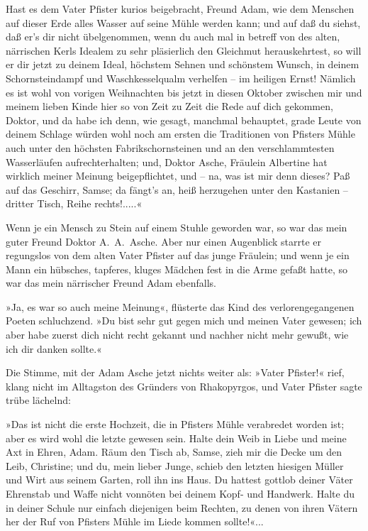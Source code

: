 Hast es dem Vater Pfister kurios beigebracht, Freund Adam, wie dem
Menschen auf dieser Erde alles Wasser auf seine Mühle werden kann;
und auf daß du siehst, daß er's dir nicht übelgenommen, wenn du
auch mal in betreff von des alten, närrischen Kerls Idealem zu sehr
pläsierlich den Gleichmut herauskehrtest, so will er dir jetzt zu
deinem Ideal, höchstem Sehnen und schönstem Wunsch, in deinem
Schornsteindampf und Waschkesselqualm verhelfen – im heiligen
Ernst! Nämlich es ist wohl von vorigen Weihnachten bis jetzt in
diesen Oktober zwischen mir und meinem lieben Kinde hier so von
Zeit zu Zeit die Rede auf dich gekommen, Doktor, und da habe ich
denn, wie gesagt, manchmal behauptet, grade Leute von deinem
Schlage würden wohl noch am ersten die Traditionen von Pfisters
Mühle auch unter den höchsten Fabrikschornsteinen und an den
verschlammtesten Wasserläufen aufrechterhalten; und, Doktor Asche,
Fräulein Albertine hat wirklich meiner Meinung beigepflichtet, und
– na, was ist mir denn dieses? Paß auf das Geschirr, Samse; da
fängt's an, heiß herzugehen unter den Kastanien – dritter Tisch,
Reihe rechts!.....«

Wenn je ein Mensch zu Stein auf einem Stuhle geworden war, so war
das mein guter Freund Doktor A.~A.~Asche. Aber nur einen Augenblick
starrte er regungslos von dem alten Vater Pfister auf das junge
Fräulein; und wenn je ein Mann ein hübsches, tapferes, kluges
Mädchen fest in die Arme gefaßt hatte, so war das mein närrischer
Freund Adam ebenfalls.

»Ja, es war so auch meine Meinung«, flüsterte das Kind des
verlorengegangenen Poeten schluchzend. »Du bist sehr gut gegen mich
und meinen Vater gewesen; ich aber habe zuerst dich nicht recht
gekannt und nachher nicht mehr gewußt, wie ich dir danken sollte.«

Die Stimme, mit der Adam Asche jetzt nichts weiter als: »Vater
Pfister!« rief, klang nicht im Alltagston des Gründers von
Rhakopyrgos, und Vater Pfister sagte trübe lächelnd:

»Das ist nicht die erste Hochzeit, die in Pfisters Mühle verabredet
worden ist; aber es wird wohl die letzte gewesen sein. Halte dein
Weib in Liebe und meine Axt in Ehren, Adam. Räum den Tisch ab,
Samse, zieh mir die Decke um den Leib, Christine; und du, mein
lieber Junge, schieb den letzten hiesigen Müller und Wirt aus
seinem Garten, roll ihn ins Haus. Du hattest gottlob deiner Väter
Ehrenstab und Waffe nicht vonnöten bei deinem Kopf- und Handwerk.
Halte du in deiner Schule nur einfach diejenigen beim Rechten, zu
denen von ihren Vätern her der Ruf von Pfisters Mühle im Liede
kommen sollte!«...

